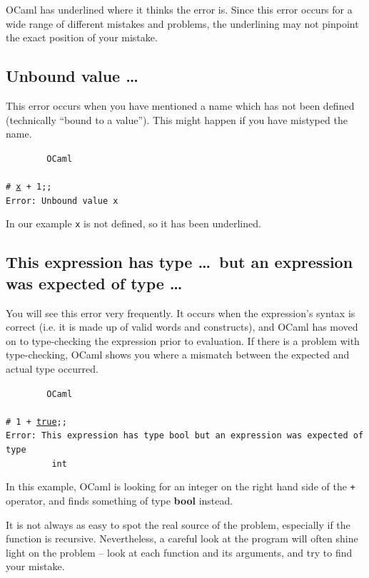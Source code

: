 \documentclass[]{book}
\newcommand{\smspace}{\vspace{4mm}}
\begin{document}
\noindent OCaml has underlined where it thinks the error is. Since this error occurs for a wide range of different mistakes and problems, the underlining may not pinpoint the exact position of your mistake.

\subsection*{Unbound value \ldots}

This error occurs when you have mentioned a name which has not been defined (technically ``bound to a value''). This might happen if you have mistyped the name.

\smspace
\noindent\verb!        OCaml!\\
\noindent\\
\texttt{\# }\underline{\verb!x!}\texttt{ + 1;;}\\
\texttt{Error:\ Unbound value x}
\smspace

\noindent In our example \texttt{x} is not defined, so it has been underlined.

\subsection*{This expression has type \ldots\ but an expression was expected of type \ldots}

You will see this error very frequently. It occurs when the expression's syntax is correct (i.e. it is made up of valid words and constructs), and OCaml has moved on to type-checking the expression prior to evaluation. If there is a problem with type-checking, OCaml shows you where a mismatch between the expected and actual type occurred.

\smspace
\noindent\verb!        OCaml!\\
\noindent\\
\texttt{\# 1 + }\underline{\verb!true!}\texttt{;;}\\
\texttt{Error:\ This expression has type bool but an expression was expected of type}\\
\verb!         !\texttt{int}
\smspace

\noindent In this example, OCaml is looking for an integer on the right hand side of the \texttt{+} operator, and finds something of type \textsf{\textbf{bool}} instead.

It is not always as easy to spot the real source of the problem, especially if the function is recursive. Nevertheless, a careful look at the program will often shine light on the problem -- look at each function and its arguments, and try to find your mistake.
\end{document}
